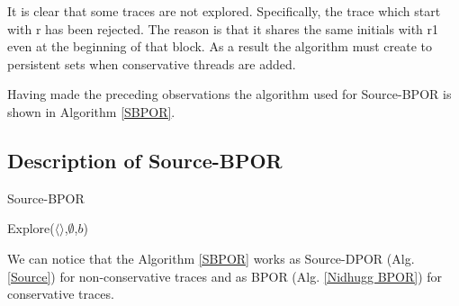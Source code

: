 It is clear that some traces are not explored. Specifically, the trace which start with r has been rejected. The reason is that it shares the same initials with r1 even at the
beginning of that block. As a result the algorithm must create to persistent sets when conservative threads are added. 

Having made the preceding observations the algorithm used for Source-BPOR is shown in Algorithm \ref{SBPOR}.

\subsection{Description of Source-BPOR}

\begin{algorithm}
    \caption{Source-BPOR}
    \label{SBPOR}
    Explore($\langle \rangle$,$\emptyset$,$b$)\;
\end{algorithm}

We can notice that the Algorithm \ref{SBPOR} works as Source-DPOR (Alg. \ref{Source}) for non-conservative traces and as BPOR (Alg. \ref{Nidhugg BPOR}) for conservative traces.

